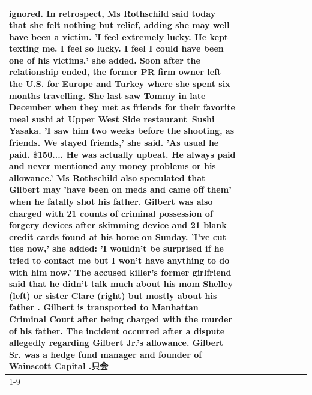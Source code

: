 \begin{table}[H]
\begin{tabular}{lllrlllll}
ignored. In retrospect, Ms Rothschild said today that she felt nothing but relief, adding she may well have been a victim. 'I feel extremely lucky. He kept texting me. I feel so lucky. I feel I could have been one of his victims,' she added. Soon after the relationship ended, the former PR firm owner left the U.S. for Europe and Turkey where she spent six months  travelling. She last saw Tommy in late December when they met as friends for their favorite meal sushi at Upper West Side restaurant Sushi Yasaka. 'I saw him two weeks before the shooting, as friends. We stayed friends,' she said. 'As usual he paid. \$150.... He was actually upbeat. He always paid and never mentioned any money problems or his allowance.' Ms Rothschild also speculated that Gilbert may 'have been on meds and came off them' when he fatally shot his father. Gilbert was also charged with 21 counts of criminal possession of forgery devices after skimming device and 21 blank credit cards found at his home on Sunday. 'I've cut ties now,' she added: 'I wouldn’t be surprised if he tried to contact me but I won’t have anything to do with him now.' The accused killer's former girlfriend said that he didn't talk much about his mom Shelley (left) or sister Clare (right) but mostly about his father . Gilbert is transported to Manhattan Criminal Court  after being charged with the murder of his father. The incident occurred after a dispute allegedly regarding Gilbert Jr.'s allowance. Gilbert Sr. was a hedge fund manager and founder of Wainscott Capital .只会 \\
\cline{1-9}

\end{tabular}
\end{table}
